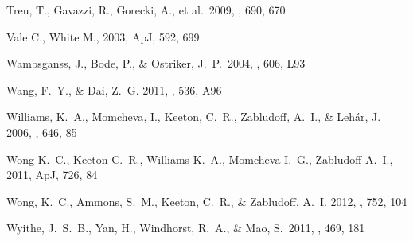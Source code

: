 \begin{thebibliography}{99}
 Treu, T., Gavazzi, R., 
Gorecki, A., et al.\ 2009, \apj, 690, 670 

 Vale C., White M., 2003, ApJ, 592, 699 

 Wambsganss, J., 
Bode, P., \& Ostriker, J.~P.\ 2004, \apjl, 606, L93 

{Wang}, F.~Y., \& {Dai}, Z.~G. 2011, \aap, 536, A96


{Williams}, K.~A., {Momcheva}, I., {Keeton}, C.~R., {Zabludoff}, A.~I., \&
  {Leh{\'a}r}, J. 2006, \apj, 646, 85


Wong K.~C., Keeton C.~R., Williams K.~A., Momcheva I.~G., Zabludoff A.~I., 
2011, ApJ, 726, 84 


{Wong}, K.~C., {Ammons}, S.~M., {Keeton}, C.~R., \& {Zabludoff}, A.~I. 2012,
  \apj, 752, 104

 Wyithe, J.~S.~B., Yan, 
H., Windhorst, R.~A., \& Mao, S.\ 2011, \nat, 469, 181 



\end{thebibliography}
